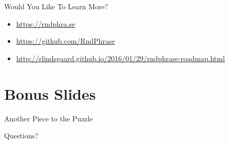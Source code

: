 \documentclass{beamer}
\begin{document}
\begin{frame}{Would You Like To Learn More?}
  \begin{itemize}
    \item \url{https://rndphra.se}
    \item \url{https://github.com/RndPhrase}
    \item \url{http://rlindsgaard.github.io/2016/01/29/rndphrase-roadmap.html}
  \end{itemize}
\end{frame}
\section*{Bonus Slides}
\begin{frame}{Another Piece to the Puzzle}
  \begin{block}{}
   \end{block}{}
\end{frame}

\begin{frame}{}
  \begin{block}{Questions?}
  \end{block}
\end{frame}
\end{document}
